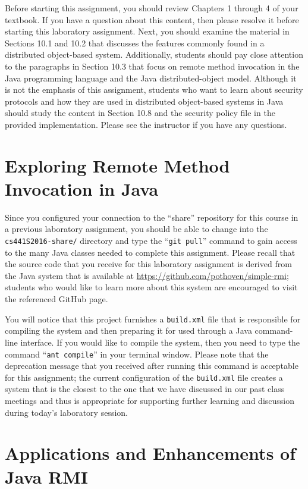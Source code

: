 Before starting this assignment, you should review Chapters 1 through 4 of your textbook. If you have a question about
this content, then please resolve it before starting this laboratory assignment. Next, you should examine the material
in Sections 10.1 and 10.2 that discusses the features commonly found in a distributed object-based system. Additionally,
students should pay close attention to the paragraphs in Section 10.3 that focus on remote method invocation in the Java
programming language and the Java distributed-object model. Although it is not the emphasis of this assignment, students
who want to learn about security protocols and how they are used in distributed object-based systems in Java should
study the content in Section 10.8 and the security policy file in the provided implementation.  Please see the
instructor if you have any questions.

\section*{Exploring Remote Method Invocation in Java}

Since you configured your connection to the ``share'' repository for this course in a previous laboratory assignment,
you should be able to change into the {\tt cs441S2016-share/} directory and type the ``{\tt git pull}'' command to gain
access to the many Java classes needed to complete this assignment. Please recall that the source code that you receive
for this laboratory assignment is derived from the Java system that is available at
\url{https://github.com/pothoven/simple-rmi}; students who would like to learn more about this system are encouraged to
visit the referenced GitHub page.

You will notice that this project furnishes a {\tt build.xml} file that is responsible for compiling the system and then
preparing it for used through a Java command-line interface. If you would like to compile the system, then you need to
type the command ``{\tt ant compile}'' in your terminal window. Please note that the deprecation message that you
received after running this command is acceptable for this assignment; the current configuration of the {\tt build.xml}
file creates a system that is the closest to the one that we have discussed in our past class meetings and thus is
appropriate for supporting further learning and discussion during today's laboratory session.

\section*{Applications and Enhancements of Java RMI}

